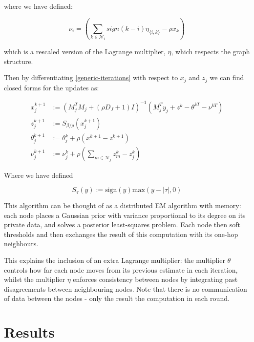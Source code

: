 \documentclass[conference]{IEEEtran}
\begin{document}
where we have defined:

\begin{equation}
\nu_i = \left(\sum_{k \in \mathcal{N}_i} sign\left(k-i\right)\eta_{\{i,k\}} - \rho x_k \right)
\end{equation}

which is a rescaled version of the Lagrange multiplier, \(\eta\), which respects the graph structure. 

Then by differentiating \eqref{generic-iterations} with respect to \(x_j\) and \(z_j\) we  can find closed forms for the updates as:

\begin{align}
x_j^{k+1} &:= \left(M_j^TM_j + (\rho D_J + 1) I\right)^{-1}\left(M_j^Ty_j +  z^k -\theta^{kT} - \nu^{kT}\right)\\
z_j^{k+1} &:= S_{\beta/\rho}\left(x_j^{k+1} \right)
 \\
\theta_j^{k+1} &:= \theta_j^{k} + \rho \left(x^{k+1}-z^{k+1}\right) \\
\nu_j^{k+1} &:= \nu_j^k + \rho\left(\sum_{m \in \mathcal{N}_j} z_m^k - z_j^k\right)
\label{dadmm_algo_lasso}
\end{align}

Where we have defined

\begin{defn}
\begin{equation}
S_{\tau}\left( y \right) := \mathrm{sign}(y)\mathrm{max}(y-|\tau|, 0)
\end{equation}
\end{defn}

\begin{remark}
This algorithm can be thought of as a distributed EM algorithm with memory: each node places a Gaussian prior with variance proportional to its degree on its private data, and solves a posterior least-squares problem. Each node then soft thresholds and then exchanges the result of this computation with its one-hop neighbours.
 
This explains the inclusion of an extra Lagrange multiplier: the multiplier \(\theta\) controls how far each node moves from its previous estimate in each iteration, whilst the multiplier \(\eta\) enforces consistency between nodes by integrating past disagreements between neighbouring nodes. Note that there is no communication of data between the nodes - only the result the computation in each round.
\end{remark}

\section{Results} \label{sec:results}
\end{document}
